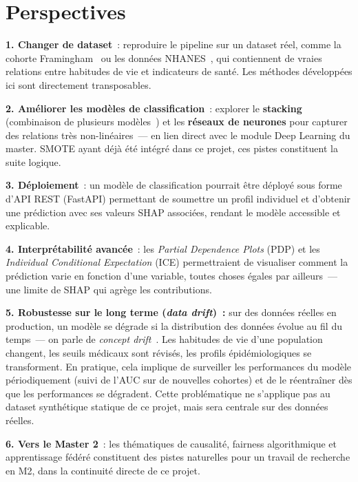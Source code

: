 \section{Perspectives}

\textbf{1. Changer de dataset}~: reproduire le pipeline sur un dataset réel, comme la cohorte Framingham~\cite{dawber1951} ou les données NHANES~\cite{nhanes}, qui contiennent de vraies relations entre habitudes de vie et indicateurs de santé. Les méthodes développées ici sont directement transposables.

\textbf{2. Améliorer les modèles de classification}~: explorer le \textbf{stacking} (combinaison de plusieurs modèles~\cite{hastie2009}) et les \textbf{réseaux de neurones} pour capturer des relations très non-linéaires~--- en lien direct avec le module Deep Learning du master. SMOTE ayant déjà été intégré dans ce projet, ces pistes constituent la suite logique.

\textbf{3. Déploiement}~: un modèle de classification pourrait être déployé sous forme d'API REST (FastAPI) permettant de soumettre un profil individuel et d'obtenir une prédiction avec ses valeurs SHAP associées, rendant le modèle accessible et explicable.

\textbf{4. Interprétabilité avancée}~: les \textit{Partial Dependence Plots} (PDP) et les \textit{Individual Conditional Expectation} (ICE) permettraient de visualiser comment la prédiction varie en fonction d'une variable, toutes choses égales par ailleurs~--- une limite de SHAP qui agrège les contributions.

\textbf{5. Robustesse sur le long terme (\textit{data drift})~:} sur des données réelles en production, un modèle se dégrade si la distribution des données évolue au fil du temps~--- on parle de \textit{concept drift}~\cite{hastie2009}. Les habitudes de vie d'une population changent, les seuils médicaux sont révisés, les profils épidémiologiques se transforment. En pratique, cela implique de surveiller les performances du modèle périodiquement (suivi de l'AUC sur de nouvelles cohortes) et de le réentraîner dès que les performances se dégradent. Cette problématique ne s'applique pas au dataset synthétique statique de ce projet, mais sera centrale sur des données réelles.

\textbf{6. Vers le Master 2}~: les thématiques de causalité, fairness algorithmique et apprentissage fédéré constituent des pistes naturelles pour un travail de recherche en M2, dans la continuité directe de ce projet.
